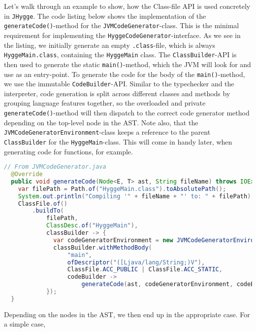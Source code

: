 Let's walk through an example to show, how the Class-file API is used concretely in \texttt{JHygge}. The code listing below shows
the implementation of the \texttt{generateCode()}-method for the \texttt{JVMCodeGenerator}-class. This is the minimal requirement
for implementing the \texttt{HyggeCodeGenerator}-interface. As we see in the listing, we initially generate an empty \texttt{.class}-file,
which is always \texttt{HyggeMain.class}, containing the \texttt{HyggeMain} class. The \texttt{ClassBuilder}-API is then used to
generate the static \texttt{main()}-method, which the JVM will look for and use as an entry-point. To generate the code for
the body of the \texttt{main()}-method, we use the immutable \texttt{CodeBuilder}-API. Similar to the typechecker and the interpreter,
code generation is split across different classes and methods by grouping language features together, so the overloaded and private
\texttt{generateCode()}-method will then dispatch to the correct code generator method depending on the top-level node in the AST.
Note also, that the \texttt{JVMCodeGeneratorEnvironment}-class keeps a reference to the parent \texttt{ClassBuilder} for the
\texttt{HyggeMain}-class. This will come in handy later, when generating code for functions, for example.

\begin{lstlisting}[language=Java]
  // From JVMCodeGenerator.java
  @Override
  public void generateCode(Node<E, T> ast, String fileName) throws IOException {
    var filePath = Path.of("HyggeMain.class").toAbsolutePath();
    System.out.println("Compiling '" + fileName + "' to: " + filePath);
    ClassFile.of()
        .buildTo(
            filePath,
            ClassDesc.of("HyggeMain"),
            classBuilder -> {
              var codeGeneratorEnvironment = new JVMCodeGeneratorEnvironment(classBuilder);
              classBuilder.withMethodBody(
                  "main",
                  ofDescriptor("([Ljava/lang/String;)V"),
                  ClassFile.ACC_PUBLIC | ClassFile.ACC_STATIC,
                  codeBuilder ->
                      generateCode(ast, codeGeneratorEnvironment, codeBuilder).return_());
            });
  }
\end{lstlisting}

Depending on the nodes in the AST, we then end up in the appropriate case. For a simple case, 

